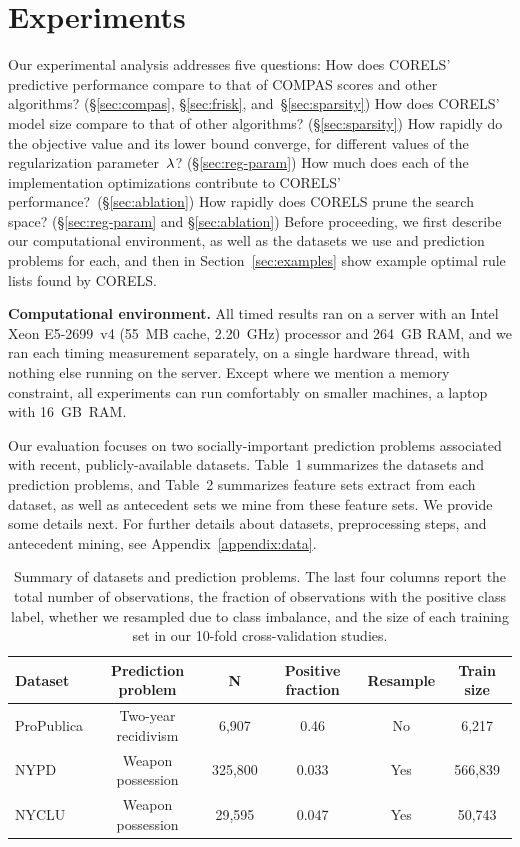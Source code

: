\section{Experiments}
\label{sec:experiments}

Our experimental analysis addresses five questions:
%
How does CORELS' predictive performance compare to that of COMPAS scores
and other algorithms? (\S\ref{sec:compas}, \S\ref{sec:frisk}, and~\S\ref{sec:sparsity})
%
How does CORELS' model size compare to that of other algorithms? (\S\ref{sec:sparsity})
%
How rapidly do the objective value and its lower bound converge,
for different values of the regularization parameter~${\lambda}$? (\S\ref{sec:reg-param})
%
How much does each of the implementation optimizations contribute to CORELS' performance?~(\S\ref{sec:ablation})
%
How rapidly does CORELS prune the search space? (\S\ref{sec:reg-param} and \S\ref{sec:ablation})
%
Before proceeding, we first describe our computational environment,
as well as the datasets we use and prediction problems for each,
and then in Section~\ref{sec:examples} show example optimal rule lists found by CORELS.

\textbf{Computational environment.}
All timed results ran on a server with an Intel Xeon E5-2699~v4 (55~MB cache, 2.20~GHz) processor and 264~GB RAM,
and we ran each timing measurement separately, on a single hardware thread, with nothing else running on the server.
%
Except where we mention a memory constraint, all experiments
can run comfortably on smaller machines, \eg a laptop with 16~GB~RAM.

Our evaluation focuses on two socially-important prediction problems associated
with recent, publicly-available datasets.
%
Table~1 summarizes the datasets and prediction problems,
and Table~2 summarizes feature sets extract from each dataset,
as well as antecedent sets we mine from these feature sets.
%
We provide some details next.
%
For further details about datasets, preprocessing steps, and antecedent mining,
see Appendix~\ref{appendix:data}.

\begin{table}[t!]
\centering
\begin{tabular}{l|c|c|c|c|c}
Dataset & Prediction problem & N & Positive fraction & Resample & Train size \\
\hline
ProPublica & Two-year recidivism & 6,907 & 0.46 & No & 6,217 \\
NYPD & Weapon possession & 325,800 & 0.033 & Yes & 566,839 \\
NYCLU & Weapon possession & 29,595 & 0.047 & Yes & 50,743 \\
\end{tabular}
\caption{Summary of datasets and prediction problems.
%
The last four columns report the total number of observations,
the fraction of observations with the positive class label,
whether we resampled due to class imbalance,
and the size of each training set in our 10-fold cross-validation studies.
}
\label{tab:datasets}
\end{table}

